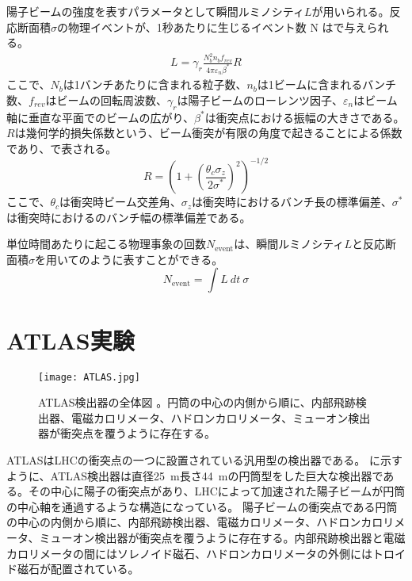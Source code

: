 陽子ビームの強度を表すパラメータとして瞬間ルミノシティ$L$が用いられる。反応断面積$\sigma$の物理イベントが、1秒あたりに生じるイベント数 N はで与えられる。
\begin{align}
  \label{eq:lumi}
  L = \gamma_{r} \frac{N_{b}^{2} n_{b} f_{rev}}{4\pi \varepsilon_{n} \beta^*}R
\end{align}
ここで、$N_{b}$は1バンチあたりに含まれる粒子数、$n_{b}$は1ビームに含まれるバンチ数、$f_{rev}$はビームの回転周波数、$\gamma_{r}$は陽子ビームのローレンツ因子、$\varepsilon_{n}$はビーム軸に垂直な平面でのビームの広がり、$\beta^{*}$は衝突点における振幅の大きさである。$R$は幾何学的損失係数という、ビーム衝突が有限の角度で起きることによる係数であり、で表される。
\begin{equation}
  \label{eq:kikaf}
  R=\left( 1+\left( \frac{\theta_{c}\sigma_{z}}{2\sigma^{*}} \right)^2 \right)^{-1/2}
\end{equation}
ここで、$\theta_c$は衝突時ビーム交差角、$\sigma_z$は衝突時におけるバンチ長の標準偏差、$\sigma^*$は衝突時におけるのバンチ幅の標準偏差である。

単位時間あたりに起こる物理事象の回数$N_\mathrm{event}$は、瞬間ルミノシティ$L$と反応断面積$\sigma$を用いてのように表すことができる。
\begin{equation}
  \label{eq:hannnou}
  N_\mathrm{event} = \int L\ dt\ \sigma
\end{equation}


\section{ATLAS実験}
\label{sec:ATLAS}
\begin{figure}[tbp]
  \centering
  \texttt{[image: ATLAS.jpg]}
  \caption[ATLAS検出器の全体図]{ATLAS検出器の全体図 \cite{ATLAS}。円筒の中心の内側から順に、内部飛跡検出器、電磁カロリメータ、ハドロンカロリメータ、ミューオン検出器が衝突点を覆うように存在する。}
  \label{fig:ATLAS}
\end{figure}

ATLASはLHCの衝突点の一つに設置されている汎用型の検出器である。 に示すように、ATLAS検出器は直径25\ \si{m}長さ44\ \si{m}の円筒型をした巨大な検出器である。その中心に陽子の衝突点があり、LHCによって加速された陽子ビームが円筒の中心軸を通過するような構造になっている。
陽子ビームの衝突点である円筒の中心の内側から順に、内部飛跡検出器、電磁カロリメータ、ハドロンカロリメータ、ミューオン検出器が衝突点を覆うように存在する。内部飛跡検出器と電磁カロリメータの間にはソレノイド磁石、ハドロンカロリメータの外側にはトロイド磁石が配置されている。


